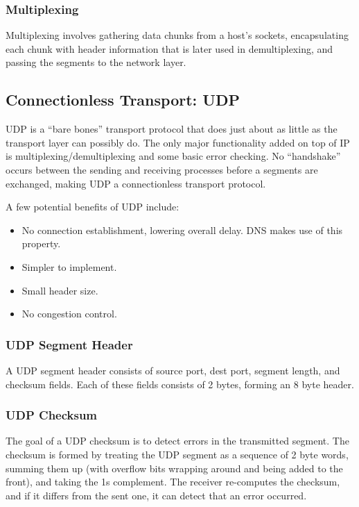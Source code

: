\documentclass[12pt,titlepage]{article}
\begin{document}
      \subsubsection{Multiplexing}
        Multiplexing involves gathering data chunks from a host's sockets, encapsulating each chunk with header information that is later used in demultiplexing, and passing the segments to
        the network layer.

    \subsection{Connectionless Transport: UDP}
      UDP is a ``bare bones'' transport protocol that does just about as little as the transport layer can possibly do. The only major functionality added on top of IP is
      multiplexing/demultiplexing and some basic error checking. No ``handshake'' occurs between the sending and receiving processes before a segments are exchanged, making UDP a
      connectionless transport protocol.

      A few potential benefits of UDP include:
      \begin{itemize}
        \item No connection establishment, lowering overall delay. DNS makes use of this property.
        \item Simpler to implement.
        \item Small header size.
        \item No congestion control.
      \end{itemize}

      \subsubsection{UDP Segment Header}
        A UDP segment header consists of source port, dest port, segment length, and checksum fields. Each of these fields consists of 2 bytes, forming an 8 byte header.

      \subsubsection{UDP Checksum}
        The goal of a UDP checksum is to detect errors in the transmitted segment. The checksum is formed by treating the UDP segment as a sequence of 2 byte words, summing
        them up (with overflow bits wrapping around and being added to the front), and taking the 1s complement. The receiver re-computes the checksum, and if it differs from
        the sent one, it can detect that an error occurred.
\end{document}
